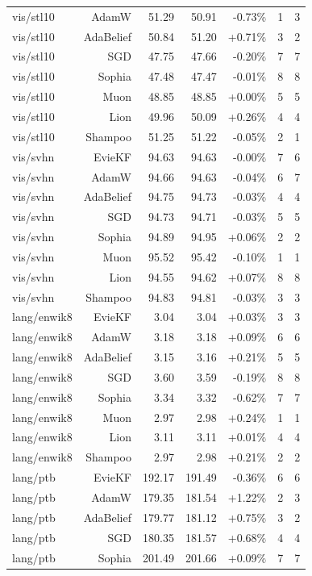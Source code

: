 \begin{table}[t]
\begin{tabular}{lrrrrrr}
vis/stl10 & AdamW & 51.29 & 50.91 & -0.73\% & 1 & 3 \\
vis/stl10 & AdaBelief & 50.84 & 51.20 & +0.71\% & 3 & 2 \\
vis/stl10 & SGD & 47.75 & 47.66 & -0.20\% & 7 & 7 \\
vis/stl10 & Sophia & 47.48 & 47.47 & -0.01\% & 8 & 8 \\
vis/stl10 & Muon & 48.85 & 48.85 & +0.00\% & 5 & 5 \\
vis/stl10 & Lion & 49.96 & 50.09 & +0.26\% & 4 & 4 \\
vis/stl10 & Shampoo & 51.25 & 51.22 & -0.05\% & 2 & 1 \\
vis/svhn & EvieKF & 94.63 & 94.63 & -0.00\% & 7 & 6 \\
vis/svhn & AdamW & 94.66 & 94.63 & -0.04\% & 6 & 7 \\
vis/svhn & AdaBelief & 94.75 & 94.73 & -0.03\% & 4 & 4 \\
vis/svhn & SGD & 94.73 & 94.71 & -0.03\% & 5 & 5 \\
vis/svhn & Sophia & 94.89 & 94.95 & +0.06\% & 2 & 2 \\
vis/svhn & Muon & 95.52 & 95.42 & -0.10\% & 1 & 1 \\
vis/svhn & Lion & 94.55 & 94.62 & +0.07\% & 8 & 8 \\
vis/svhn & Shampoo & 94.83 & 94.81 & -0.03\% & 3 & 3 \\
lang/enwik8 & EvieKF & 3.04 & 3.04 & +0.03\% & 3 & 3 \\
lang/enwik8 & AdamW & 3.18 & 3.18 & +0.09\% & 6 & 6 \\
lang/enwik8 & AdaBelief & 3.15 & 3.16 & +0.21\% & 5 & 5 \\
lang/enwik8 & SGD & 3.60 & 3.59 & -0.19\% & 8 & 8 \\
lang/enwik8 & Sophia & 3.34 & 3.32 & -0.62\% & 7 & 7 \\
lang/enwik8 & Muon & 2.97 & 2.98 & +0.24\% & 1 & 1 \\
lang/enwik8 & Lion & 3.11 & 3.11 & +0.01\% & 4 & 4 \\
lang/enwik8 & Shampoo & 2.97 & 2.98 & +0.21\% & 2 & 2 \\
lang/ptb & EvieKF & 192.17 & 191.49 & -0.36\% & 6 & 6 \\
lang/ptb & AdamW & 179.35 & 181.54 & +1.22\% & 2 & 3 \\
lang/ptb & AdaBelief & 179.77 & 181.12 & +0.75\% & 3 & 2 \\
lang/ptb & SGD & 180.35 & 181.57 & +0.68\% & 4 & 4 \\
lang/ptb & Sophia & 201.49 & 201.66 & +0.09\% & 7 & 7 \\

\end{tabular}
\end{table}
